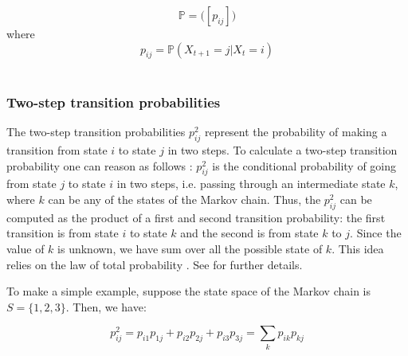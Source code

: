 \documentclass[\main/main.tex]{subfiles}
\begin{document}
\begin{equation}
   \mathds{P} = \Big([ p_{ij}] \Big)
\end{equation}
where
\begin{equation}
    p_{ij} = \mathds{P} ( X_{t+1} = j | X_t = i)
\end{equation}\\


\subsubsection{Two-step transition probabilities}

\noindent The two-step transition probabilities $p_{ij}^2$ represent the probability of making a transition from state $i$ to state $j$ in two steps. To calculate a two-step transition probability one can reason as follows \citep{Sheskin2010}: $p_{ij}^2$ is the conditional probability of going from state $j$ to state $i$ in two steps, i.e. passing through an intermediate state $k$, where $k$ can be any of the states of the Markov chain. Thus, the $p_{ij}^2$ can be computed as the product of a first and second transition probability: the first transition is from state $i$ to state $k$ and the second is from state $k$ to $j$. Since the value of $k$ is unknown, we have sum over all the possible state of $k$. This idea relies on the law of total probability . See \cite{Zwillinger2000} for further details.

To make a simple example, suppose the state space of the Markov chain is $S = \{ 1,2,3\}$. Then, we have:

\begin{equation}
    p_{ij}^2 = p_{i1}p_{1j} + p_{i2}p_{2j} + p_{i3}p_{3j} = \sum_k p_{ik}p_{kj}
\end{equation}
\end{document}
